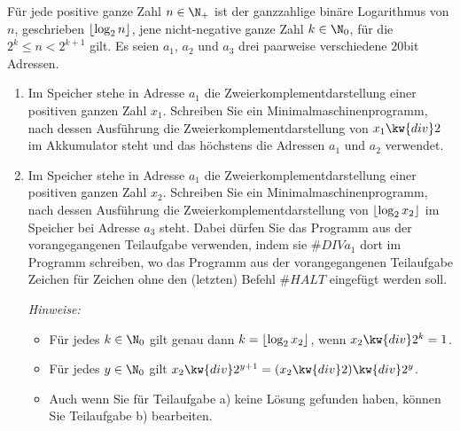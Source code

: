 \documentclass[12pt]{article}
\DeclarePairedDelimiter\floor{\lfloor}{\rfloor}
\begin{document}
\begin{aufgabe}[4 + 4 = 8]
  Für jede positive ganze Zahl $n \in \N_+$ ist der ganzzahlige binäre Logarithmus von $n$, geschrieben $\floor{\log_2 n}$, jene nicht-negative ganze Zahl $k \in \N_0$, für die $2^k \leq n < 2^{k + 1}$ gilt. Es seien $a_1$, $a_2$ und $a_3$ drei paarweise verschiedene $20$bit Adressen.
  \begin{enumerate}
    \item Im Speicher stehe in Adresse $a_1$ die Zweierkomplementdarstellung einer positiven ganzen Zahl $x_1$. Schreiben Sie ein Minimalmaschinenprogramm, nach dessen Ausführung die Zweierkomplementdarstellung von $x_1 \kw{ div } 2$ im Akkumulator steht und das höchstens die Adressen $a_1$ und $a_2$ verwendet. %
%
    \item Im Speicher stehe in Adresse $a_1$ die Zweierkomplementdarstellung einer positiven ganzen Zahl $x_2$. Schreiben Sie ein Minimalmaschinenprogramm, nach dessen Ausführung die Zweierkomplementdarstellung von $\floor{\log_2 x_2}$ im Speicher bei Adresse $a_3$ steht. Dabei dürfen Sie das Programm aus der vorangegangenen Teilaufgabe verwenden, indem sie $\#{DIV } a_1$ dort im Programm schreiben, wo das Programm aus der vorangegangenen Teilaufgabe Zeichen für Zeichen ohne den (letzten) Befehl $\#{HALT}$ eingefügt werden soll. %

          \emph{Hinweise:}
          \begin{itemize}
          \item Für jedes $k \in \N_0$ gilt genau dann $k = \floor{\log_2 x_2}$, wenn $x_2 \kw{ div } 2^k = 1$.
          \item Für jedes $y \in \N_0$ gilt $x_2 \kw{ div } 2^{y + 1} = (x_2 \kw{ div } 2) \kw{ div } 2^y$.
          \item Auch wenn Sie für Teilaufgabe a) keine Lösung gefunden haben, können Sie Teilaufgabe b) bearbeiten.
          \end{itemize}
        \end{enumerate}
\end{aufgabe}
\end{document}

